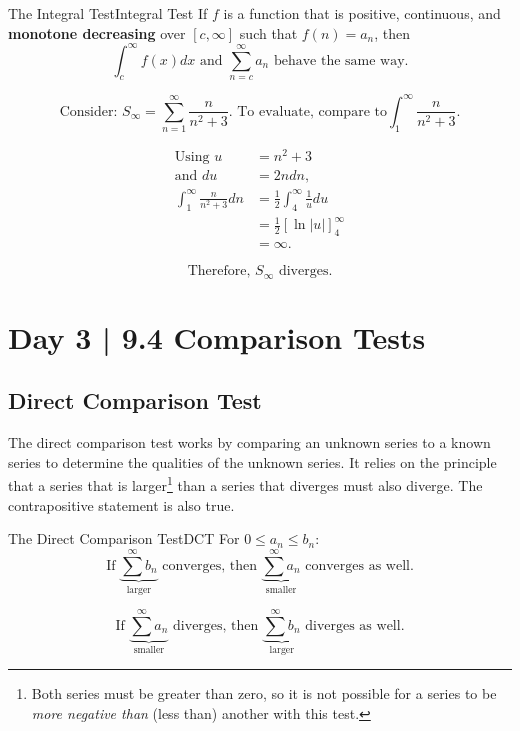 \documentclass[10pt]{article}
\theoremstyle{definition}
\begin{document}
\begin{theorem}{The Integral Test}{Integral Test}
    If $f$ is a function that is positive, continuous, and \textbf{monotone decreasing} over $[c, \infty]$ such that $f(n)= a_n$, then
    \vspace{-0.3cm}
    \[\int_{c}^{\infty}f(x)dx \text{ and } \sum_{n=c}^{\infty} a_n \text{ behave the same way.}\]
\end{theorem}

\[\text{Consider: } S_\infty=\sum_{n=1}^{\infty} \frac{n}{n^2+3}. \text{ To evaluate, compare to} \int_{1}^{\infty} \frac{n}{n^2+3}.\]


\begin{align*}
\text{Using } u &= n^2 + 3 \\
\text{and } du &= 2ndn, \\
\int_{1}^{\infty} \frac{n}{n^2+3}dn &= \frac{1}{2} \int_{4}^{\infty} \frac{1}{u}du \\
&= \frac{1}{2} [\ln|u|]^{\infty}_{4}\\
&= \infty.
\end{align*}

\[\text{Therefore, $S_\infty$ diverges.}\]

\newpage

\section{Day 3 | 9.4 Comparison Tests}

\subsection{Direct Comparison Test}
The direct comparison test works by comparing an unknown series to a known series to determine the qualities of the unknown series. It relies on the principle that a series that is larger\footnote{Both series must be greater than zero, so it is not possible for a series to be \emph{more negative than} (less than) another with this test.} than a series that diverges must also diverge. The contrapositive statement is also true.

\begin{theorem}{The Direct Comparison Test}{DCT}
    For $0 \le a_n \le b_n$:
            \[\text{If } \underbrace{\sum^{\infty} b_n}_{\text{larger}} \text{ converges, then } \underbrace{\sum^{\infty} a_n}_{\text{smaller}} \text{ converges as well.}\]

            \[\text{If } \underbrace{\sum^{\infty} a_n}_{\text{smaller}} \text{ diverges, then } \underbrace{\sum^{\infty} b_n}_{\text{larger}} \text{ diverges as well.}\]

\end{theorem}
\end{document}
